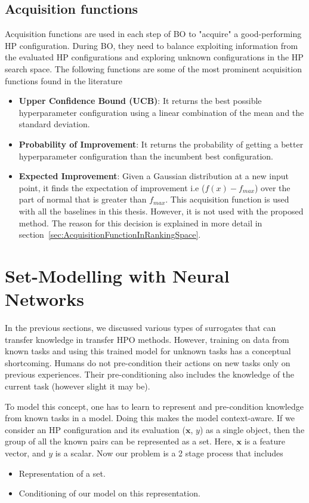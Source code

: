 \documentclass[12pt, twoside, ngerman]{report}
\begin{document}

 

\subsection{Acquisition functions}
Acquisition functions are used in each step of BO to "acquire" a good-performing HP configuration.
During BO, they need to balance exploiting information from the evaluated HP configurations and exploring unknown configurations in the HP search space.
The following functions are some of the most prominent acquisition functions found in the literature~\cite{GPTutorial}
\begin{itemize}
\item \textbf{Upper Confidence Bound (UCB)}: It returns the best possible hyperparameter configuration using a linear combination of the mean and the standard deviation.
\item \textbf{Probability of Improvement}: It returns the probability of getting a better hyperparameter configuration than the incumbent best configuration.
\item \textbf{Expected Improvement}: Given a Gaussian distribution at a new input point, it finds the expectation of improvement i.e ($f(x) - f_{max}$) over the part of normal that is greater than $f_{max}$.  This acquisition function is used with all the baselines in this thesis. However, it is not used with the proposed method. The reason for this decision is explained in more detail in section~\ref{sec:AcquisitionFunctionInRankingSpace}.
\end{itemize}


\section{Set-Modelling with Neural Networks}

In the previous sections, we discussed various types of surrogates that can transfer knowledge in transfer HPO methods.
However, training on data from known tasks and using this trained model for unknown tasks has a conceptual shortcoming.
Humans do not pre-condition their actions on new tasks only on previous experiences.
Their pre-conditioning also includes the knowledge of the current task (however slight it may be).

To model this concept, one has to learn to represent and pre-condition knowledge from known tasks in a model.
Doing this makes the model context-aware.
If we consider an HP configuration and its evaluation ($\textbf{x}$, $y$) as a single object, then the group of all the known pairs can be represented as a set.
Here, $\textbf{x}$ is a feature vector, and $y$ is a scalar.
Now our problem is a 2 stage process that includes
\begin{itemize}
\item Representation of a set.
\item Conditioning of our model on this representation.
\end{itemize}
\end{document}
